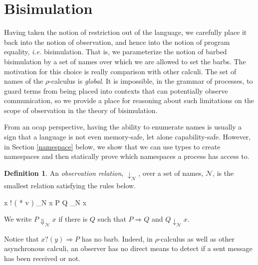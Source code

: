 \documentclass[]{amsart}
\newcommand{\id}[1]{\texttt{#1}}
\newcommand{\juxtap}{\mathbin{\id{|}}}
\newcommand{\concat}{\Rightarrow}
\newcommand{\nameeq}{\mathbin{\equiv_N}}
\newcommand{\binpar}[2]{#1 \juxtap #2}
\newcommand{\outputp}[2]{#1 ! ( * #2 )}
\newcommand{\prefix}[3]{#1 ? ( #2 ) \concat #3}
\newcommand{\wred}{\Rightarrow}
\theoremstyle{definition}
\newtheorem{defn}[thm]{Definition}
\theoremstyle{remark}
\numberwithin{equation}{subsection}
\newcommand{\pic}{$\pi$-calculus}
\newcommand{\rhoc}{$\rho$-calculus}
\begin{document}
\section{Bisimulation}

Having taken the notion of restriction out of the language, we
carefully place it back into the notion of observation, and hence into
the notion of program equality, {\em i.e.} bisimulation. That is, we
parameterize the notion of barbed bisimulation by a set of names over
which we are allowed to set the barbs. The motivation for this choice
is really comparison with other calculi. The set of names of the
{\rhoc} is \textit{global}. It is impossible, in the grammar of
processes, to guard terms from being placed into contexts that can
potentially observe communication, so we provide a place for
reasoning about such limitations on the scope of observation in the
theory of bisimulation.

From an ocap perspective, having the ability to enumerate names is
usually a sign that a language is not even memory-safe, let alone
capability-safe.  However, in Section \ref{namespace} below, we show
that we can use types to create namespaces and then statically prove
which namespaces a process has access to.


\begin{defn}
An \emph{observation relation}, $\downarrow_{\mathcal N}$, over a set
of names, $\mathcal N$, is the smallest relation satisfying the rules
below.

\infrule[Out-barb]{y \in {\mathcal N}, \; x \nameeq y}
		  {\outputp{x}{v} \downarrow_{\mathcal N} x}
		  {\binpar{P}{Q} \downarrow_{\mathcal N} x}

We write $P \Downarrow_{\mathcal N} x$ if there is $Q$ such that 
$P \wred Q$ and $Q \downarrow_{\mathcal N} x$.
\end{defn}

Notice that $\prefix{x}{y}{P}$ has no barb.  Indeed, in {\rhoc} as well
as other asynchronous calculi, an observer has no direct means to
detect if a sent message has been received or not.
\end{document}
